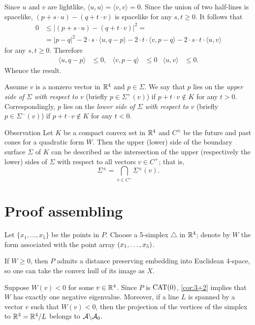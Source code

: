 \documentclass{article}
\begin{document}
Since $u$ and $v$ are lightlike, $\langle u,u\rangle=\langle v,v\rangle=0$.
Since the union of two half-lines is spacelike, $(p+s\cdot u)-(q+t\cdot v)$ is spacelike for any $s,t\ge 0$.
It follows that
\begin{align*}
0&\le |(p+s\cdot u)-(q+t\cdot v)|^2=
\\
&=|p-q|^2-2\cdot s \cdot\langle u,q-p\rangle-2\cdot t\cdot\langle v,p-q\rangle- 2\cdot s\cdot t\cdot \langle u,v\rangle
\end{align*}
for any $s,t\ge0$.
Therefore
\begin{align*}
\langle u,q-p\rangle&\le 0,
& 
\langle v,p-q\rangle&\le 0
&
\langle u,v\rangle&\le 0.
\end{align*}
Whence the result.
\qeds


Assume $v$ is a nonzero vector in $\mathbb{R}^4$ and $p\in\Sigma$.
We say that $p$ lies on the \emph{upper side of $\Sigma$ with respect to $v$} (briefly $p\in \Sigma^+(v)$) if $p+t\cdot v\notin K$ for any $t>0$.
Correspondingly, $p$ lies on the \emph{lower side of $\Sigma$ with respect to $v$} (briefly $p\in \Sigma^-(v)$) if $p+t\cdot v\notin K$ for any $t<0$.

\begin{thm}{Observation}\label{obs:Sigma(v)}
Let $K$ be a compact convex set in $\mathbb{R}^4$ and $C^\pm$ be the future and past cones for a quadratic form $W$.
Then the upper (lower) side of the boundary surface $\Sigma$ of $K$ can be described as the intersection of the upper (respectively the lower) sides of $\Sigma$ with respect to all vectors $v\in C^+$;
that is,
\[\Sigma^\pm=\bigcap_{v\in C^+}\Sigma^\pm(v).\]
\end{thm}

\section{Proof assembling}

Let $\{x_1,\dots,x_5\}$ be the points in $P$.
Choose a 5-simplex $\triangle$ in $\mathbb{R}^4$; denote by $W$ the form associated with the point array $(x_1,\z\dots,x_5)$.

If $W\ge0$, then $P$ admits a distance preserving embedding into Euclidean 4-space, so one can take the convex hull of its image as $X$.

Suppose $W(v)<0$ for some $v\in\mathbb{R}^4$.
Since $P$ is $\mathrm{CAT}(0)$, \ref{cor:3+2} implies that $W$ has exactly one negative eigenvalue.
Moreover, if a line $L$ is spanned by a vector $v$ such that $W(v)<0$, then the projection of the vertices of the simplex to $\mathbb{R}^3=\mathbb{R}^4/L$ belongs to $\mathcal{A}\backslash\mathcal{A}_0$.
\end{document}
